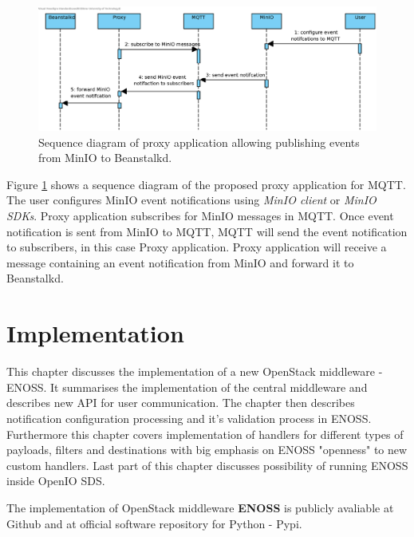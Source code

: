     \begin{figure}[H]
        \centering
        \includegraphics[angle=90,height=0.78\textheight]{obrazky-figures/minio-proxy.eps}
        \caption{Sequence diagram of proxy application allowing publishing events from MinIO to Beanstalkd.}
        \label{fig:minioProxy}
    \end{figure}

    Figure \ref{fig:minioProxy} shows a sequence diagram of the proposed proxy application for MQTT. The user configures MinIO event notifications using \textit{MinIO client} or \textit{MinIO SDKs}. Proxy application subscribes for MinIO messages in MQTT. Once event notification is sent from MinIO to MQTT, MQTT will send the event notification to subscribers, in this case Proxy application. Proxy application will receive a message containing an event notification from MinIO and forward it to Beanstalkd.


\chapter{Implementation}
    This chapter discusses the implementation of a new OpenStack middleware - ENOSS. It summarises the implementation of the central middleware and describes new API for user communication. The chapter then describes notification configuration processing and it's validation process in ENOSS. Furthermore this chapter covers implementation of handlers for different types of payloads, filters and destinations with big emphasis on ENOSS "openness" to new custom handlers. Last part of this chapter discusses possibility of running ENOSS inside OpenIO SDS.

    The implementation of OpenStack middleware \textbf{ENOSS} is publicly avaliable at Github and at official software repository for Python - Pypi.



